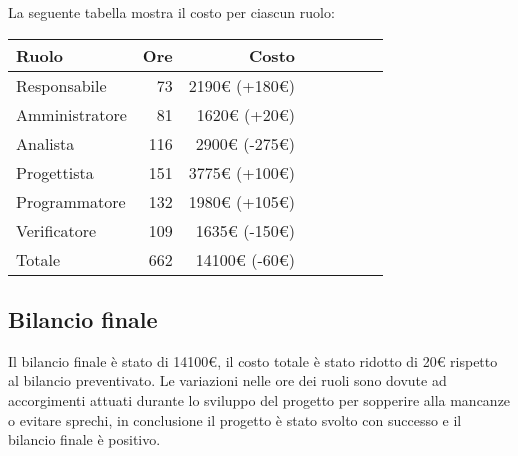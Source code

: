 La seguente tabella mostra il costo per ciascun ruolo:
\begin{table}[H]
    \begin{tabularx}{\linewidth}{X|rrrrrrr}
    \rowcolor{gray!30}Ruolo & Ore & Costo \\
    \hline
    Responsabile                            & 73     & 2190€ (+180€)\\
    \rowcolor{gray!10}Amministratore        & 81     & 1620€ (+20€)\\
    Analista                                & 116    & 2900€ (-275€)\\
    \rowcolor{gray!10}Progettista           & 151    & 3775€ (+100€) \\
    Programmatore                           & 132    & 1980€ (+105€) \\
    \rowcolor{gray!10}Verificatore          & 109    & 1635€ (-150€)\\
    \hline Totale                           & 662    & 14100€ (-60€) \\ 
    \end{tabularx}
\end{table}


\subsection{Bilancio finale}

Il bilancio finale è stato di 14100€, il costo totale è stato ridotto di 20€ rispetto al bilancio preventivato. Le variazioni nelle ore dei ruoli sono dovute ad accorgimenti attuati durante lo sviluppo del progetto per sopperire alla mancanze o evitare sprechi, in conclusione il progetto è stato svolto con successo e il bilancio finale è positivo.